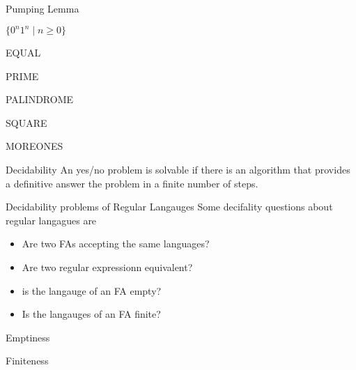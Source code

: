 \documentclass{beamer}
\begin{document}
\begin{frame}{Pumping Lemma}

\end{frame}

\begin{frame}{$\{0^n 1^n\mid n\geq 0\}$}

\end{frame}


\begin{frame}{EQUAL}

\end{frame}


\begin{frame}{PRIME}

\end{frame}


\begin{frame}{PALINDROME}

\end{frame}


\begin{frame}{SQUARE}

\end{frame}


\begin{frame}{MOREONES}

\end{frame}

\begin{frame}{Decidability}
An yes/no problem is solvable if there is an algorithm that provides 
a definitive answer the problem in a finite number of steps. 
\end{frame}

\begin{frame}{Decidability problems of Regular Langauges}
Some decifality questions about regular langagues are 
\begin{itemize}
  \item Are two FAs accepting the same languages?
  \item Are two regular expressionn equivalent?
  \item is the langauge of an FA empty?
  \item Is the langauges of an FA finite? 
\end{itemize}
\end{frame}

\begin{frame}{Emptiness} 
\begin{theorem}

\end{theorem}
\end{frame}

\begin{frame}{Finiteness}

\end{frame}
\end{document}
